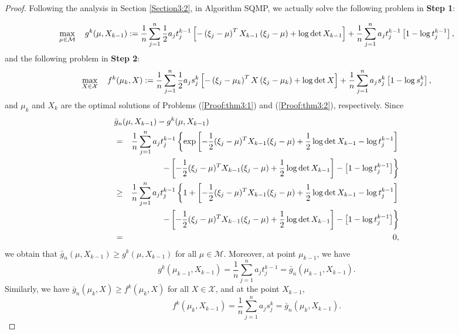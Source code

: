 \begin{proof}
Following the analysis in Section \ref{Section3:2}, in Algorithm
SQMP, we actually solve the following problem in {\bf Step 1}:

{\small{
\begin{equation}\label{Proof:thm3:1}
\max_{\mu\in \mathcal{M}}\quad g^k(\mu,X_{k-1}):={1\over
n}\sum_{j=1}^n \frac{1}{2}a_j
t_j^{k-1}\left[-\left(\xi_j-\mu\right)^T
X_{k-1}\left(\xi_j-\mu\right)+\log\det X_{k-1}\right]+{1\over
n}\sum_{j=1}^na_jt_j^{k-1}\left[1-\log t_j^{k-1}\right],
\end{equation}}}and the following problem in {\bf Step 2}:
\begin{equation}\label{Proof:thm3:2}
\max_{X\in\mathcal {X}}\quad f^k(\mu_{k},X):={1\over n}\sum_{j=1}^n
\frac{1}{2}a_j s_j^k\left[-\left(\xi_j-\mu_{k}\right)^T
X\left(\xi_j-\mu_{k}\right)+\log\det X\right]+{1\over
n}\sum_{j=1}^na_js_j^k\left[1-\log s_j^k\right],
\end{equation}
and $\mu_k$ and $X_k$ are the optimal solutions of Problems
(\ref{Proof:thm3:1}) and (\ref{Proof:thm3:2}), respectively. Since
\begin{eqnarray*}
\lefteqn{\bar g_n(\mu,X_{k-1})-g^k(\mu,X_{k-1})}\\
&=& {1\over n}\sum_{j=1}^n a_jt_j^{k-1}\left\{ \exp\left[-{1\over
2}(\xi_j-\mu)^T X_{k-1}(\xi_j-\mu)+{1\over 2}\log\det X_{k-1}-\log
t_j^{k-1}\right]\right.\nonumber\\
&& \left.-\left[-{1\over 2}(\xi_j-\mu)^T X_{k-1}(\xi_j-\mu)+{1\over
2}\log\det X_{k-1}\right]-\left[1-\log t_j^{k-1}\right]\right\}\\
&\ge& {1\over n}\sum_{j=1}^n a_jt_j^{k-1}\left\{1+\left[-{1\over
2}(\xi_j-\mu)^T X_{k-1}(\xi_j-\mu)+{1\over 2}\log\det X_{k-1}-\log
t_j^{k-1}\right]\right.\nonumber\\
&& \left.-\left[-{1\over 2}(\xi_j-\mu)^T X_{k-1}(\xi_j-\mu)+{1\over
2}\log\det X_{k-1}\right]-\left[1-\log t_j^{k-1}\right]\right\}\\
&=& 0,
\end{eqnarray*}
we obtain that $\bar g_n(\mu,X_{k-1})\ge g^k(\mu,X_{k-1})$ for all
$\mu\in \mathcal {M}$. Moreover, at point $\mu_{k-1}$, we have \[
g^k(\mu_{k-1},X_{k-1})=\frac{1}{n}\sum_{j=1}^na_jt_j^{k-1}=\bar
g_n(\mu_{k-1},X_{k-1}).\]
Similarly, we have $\bar g_n(\mu_k,X)\ge f^k(\mu_k,X)$ for all $X\in
\mathcal {X}$, and at the point $X_{k-1}$,
\[f^k(\mu_{k},X_{k-1})=\frac{1}{n}\sum_{j=1}^na_js_j^{k}=\bar
g_n(\mu_k,X_{k-1}).\]


\end{proof}
